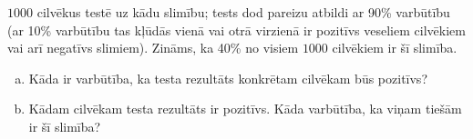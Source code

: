 \documentclass[a4paper,12pt]{article}
\begin{document}
\vspace{10pt}
\begin{problem}
$1000$ cilvēkus testē uz kādu slimību; tests dod pareizu atbildi ar 90\% varbūtību (ar 10\% varbūtību tas kļūdās vienā vai otrā virzienā \textendash{}
ir pozitīvs veseliem cilvēkiem vai arī negatīvs slimiem). Zināms, ka  40\% no visiem $1000$ cilvēkiem ir šī slimība.
\begin{enumerate}[(a)]
\item Kāda ir varbūtība, ka testa rezultāts konkrētam cilvēkam būs pozitīvs?
\item Kādam cilvēkam testa rezultāts ir pozitīvs. Kāda varbūtība, ka viņam tiešām ir šī slimība?
\end{enumerate}
\end{problem}
\end{document}
